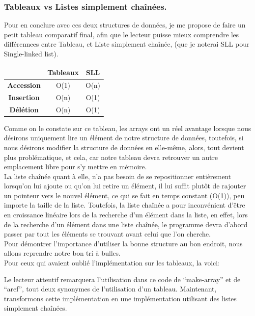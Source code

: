 \documentclass[a4paper, 12pt]{article}
\numberwithin{equation}{subsection}
\begin{document}
\subsubsection{Tableaux vs Listes simplement chaînées.}
Pour en conclure avec ces deux structures de données, je me propose de faire un petit tableau comparatif final, afin que le lecteur puisse mieux comprendre les différennces entre Tableau, et Liste simplement chaînée, (que je noterai SLL pour Single-linked list).
\begin{table}[H]
  \centering
  \begin{tabular}{|c|c|c|}
    \hline & Tableaux & SLL \\
    \hline {\bf Accession} & O(1) & O(n) \\
    \hline {\bf Insertion} & O(n) & O(1) \\
    \hline {\bf Délétion}  & O(n) & O(1) \\
    \hline
  \end{tabular}
\end{table} \smallskip
Comme on le constate sur ce tableau, les arrays ont un réel avantage lorsque nous désirons uniquement lire un élément de notre structure de données, toutefois, si nous désirons modifier la structure de données en elle-même, alors, tout devient plus problématique, et cela, car notre tableau devra retrouver un autre emplacement libre pour s'y mettre en mémoire. \\
La liste chaînée quant à elle, n'a pas besoin de se repositionner entièrement lorsqu'on lui ajoute ou qu'on lui retire un élément, il lui suffit plutôt de rajouter un pointeur vers le nouvel élément, ce qui se fait en temps constant (O(1)), peu importe la taille de la liste. Toutefois, la liste chaînée a pour inconvénient d'être en croissance linéaire lors de la recherche d'un élément dans la liste, en effet, lors de la recherche d'un élément dans une liste chaînée, le programme devra d'abord passer par tout les éléments se trouvant avant celui que l'on cherche. \\
Pour démontrer l'importance d'utiliser la bonne structure au bon endroit, nous allons reprendre notre bon tri à bulles. \\
Pour ceux qui avaient oublié l'implémentation sur les tableaux, la voici:

Le lecteur attentif remarquera l'utilisation dans ce code de ``make-array'' et de ``aref'', tout deux synonymes de l'utilisation d'un tableau. Maintenant, transformons cette implémentation en une implémentation utilisant des listes simplement chaînées. \\
\end{document}
